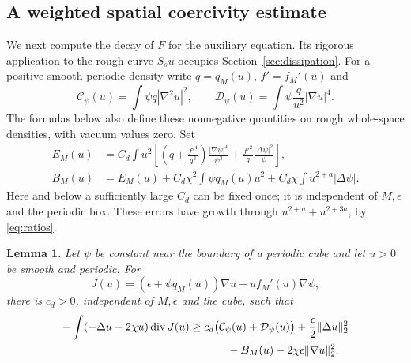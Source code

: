\documentclass[11pt]{article}
\numberwithin{equation}{section}
\newtheorem{lemma}[theorem]{Lemma}
\theoremstyle{definition}
\theoremstyle{remark}
\newcommand{\Div}{\operatorname{div}}
\newcommand{\norm}[1]{\lVert #1\rVert}
\newcommand{\Cpsi}{\mathcal C_\psi}
\newcommand{\Dpsi}{\mathcal D_\psi}
\begin{document}
\subsection{A weighted spatial coercivity estimate}
We next compute the decay of $F$ for the auxiliary equation. Its rigorous
application to the rough curve $S_su$ occupies Section~\ref{sec:dissipation}.
For a positive smooth periodic density write $q=q_M(u)$, $f'=f_M'(u)$ and
\begin{equation}\label{eq:CD}
 \Cpsi(u)=\int\psi q|\nabla^2u|^2,\qquad
 \Dpsi(u)=\int\psi\frac q{u^2}|\nabla u|^4.
\end{equation}
The formulas below also define these nonnegative quantities on rough
whole-space densities, with vacuum values zero. Set
\begin{align}
 E_M(u)&=C_d\int u^2\left[
  \left(q+\frac{f'^4}{q^3}\right)\frac{|\nabla\psi|^4}{\psi^3}
       +\frac{f'^2}{q}\frac{|\Delta\psi|^2}{\psi}\right],
                                                    \label{eq:EM}\\
 B_M(u)&=E_M(u)+C_d\chi^2\int\psi q_M(u)u^2
                   +C_d\chi\int u^{2+a}|\Delta\psi|.  \label{eq:BM}
\end{align}
Here and below a sufficiently large $C_d$ can be fixed once; it is
independent of $M,\epsilon$ and the periodic box. These errors have growth
through $u^{2+a}+u^{2+3a}$, by \eqref{eq:ratios}.

\begin{lemma}\label{lem:spatial}
Let $\psi$ be constant near the boundary of a periodic cube and let
$u>0$ be smooth and periodic. For
\begin{equation}\label{eq:aux-flux}
 J(u)=(\epsilon+\psi q_M(u))\nabla u
                          +u f_M'(u)\nabla\psi,
\end{equation}
there is $c_d>0$, independent of $M,\epsilon$ and the cube, such that
\begin{align}\label{eq:spatial-dissipation}
 -\int(-\Delta u-2\chi u)\Div J(u)
 &\ge c_d\bigl(\Cpsi(u)+\Dpsi(u)\bigr)
                +\frac\epsilon2\norm{\Delta u}_2^2\notag\\
 &\hspace{12mm}-B_M(u)-2\chi\epsilon\norm{\nabla u}_2^2.
\end{align}
\end{lemma}
\end{document}
